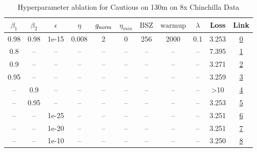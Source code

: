 \begin{table}[H]
\centering
\caption{Hyperparameter ablation for Cautious on 130m on 8x Chinchilla Data}
\label{tab:ablation_cautious_130m_on_8x_chinchilla_data}
\begin{tabular}{ccccccccccc}
\toprule
$\beta_1$ & $\beta_2$ & $\epsilon$ & $\eta$ & $g_{\mathrm{norm}}$ & $\eta_{min}$ & $\mathrm{BSZ}$ & $\mathrm{warmup}$ & $\lambda$ & Loss & Link \\
\midrule
0.98 & 0.98 & 1e-15 & 0.008 & 2 & 0 & 256 & 2000 & 0.1 & 3.253 & \href{https://wandb.ai/marin-community/optimizer-scaling/runs/sweep-130m-21B-cautious3e1de9lr0.008-wd0.1-minlr0-warmup2000-b10-8f1bb6}{0} \\
\midrule
0.8 & -- & -- & -- & -- & -- & -- & -- & -- & 7.395 & \href{https://wandb.ai/marin-community/optimizer-scaling/runs/sweep-130m-21B-cautious903025lr0.008-wd0.1-minlr0-warmup2000-b10-c9b0ed}{1} \\
0.9 & -- & -- & -- & -- & -- & -- & -- & -- & 3.271 & \href{https://wandb.ai/marin-community/optimizer-scaling/runs/sweep-130m-21B-cautiousdb200alr0.008-wd0.1-minlr0-warmup2000-b10-d34aeb}{2} \\
0.95 & -- & -- & -- & -- & -- & -- & -- & -- & 3.259 & \href{https://wandb.ai/marin-community/optimizer-scaling/runs/sweep-130m-21B-cautious1b41e3lr0.008-wd0.1-minlr0-warmup2000-b10-e60376}{3} \\
-- & 0.9 & -- & -- & -- & -- & -- & -- & -- & >10 & \href{https://wandb.ai/marin-community/optimizer-scaling/runs/sweep-130m-21B-cautious918292lr0.008-wd0.1-minlr0-warmup2000-b10-43c09c}{4} \\
-- & 0.95 & -- & -- & -- & -- & -- & -- & -- & 3.253 & \href{https://wandb.ai/marin-community/optimizer-scaling/runs/sweep-130m-21B-cautious8370eflr0.008-wd0.1-minlr0-warmup2000-b10-beca91}{5} \\
-- & -- & 1e-25 & -- & -- & -- & -- & -- & -- & 3.251 & \href{https://wandb.ai/marin-community/optimizer-scaling/runs/sweep-130m-21B-cautious40f0d8lr0.008-wd0.1-minlr0-warmup2000-b10-5be279}{6} \\
-- & -- & 1e-20 & -- & -- & -- & -- & -- & -- & 3.251 & \href{https://wandb.ai/marin-community/optimizer-scaling/runs/sweep-130m-21B-cautious000697lr0.008-wd0.1-minlr0-warmup2000-b10-767fda}{7} \\
-- & -- & 1e-10 & -- & -- & -- & -- & -- & -- & 3.250 & \href{https://wandb.ai/marin-community/optimizer-scaling/runs/sweep-130m-21B-cautious3d84f2lr0.008-wd0.1-minlr0-warmup2000-b10-222f29}{8} \\

\end{tabular}
\end{table}
